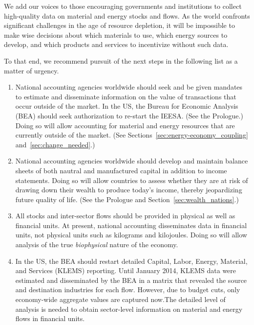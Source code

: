 We add our voices to those encouraging governments and 
institutions to collect high-quality data on material 
and energy stocks and flows.
As the world confronts significant challenges
in the age of resource depletion,
it will be impossible to make wise decisions about
which materials to use,
which energy sources to develop, and 
which products and services to incentivize
without such data.

To that end, we recommend pursuit of the next steps in the following list
as a matter of urgency.


\begin{enumerate}
	
	\item{National accounting agencies worldwide should seek and be given
			mandates to estimate and disseminate information on 
			the value of transactions that occur outside of the market.
			In the US, the Bureau for Economic Analysis (BEA) should seek authorization 
			to re-start the IEESA. 
			(See the Prologue.)
			Doing so will allow accounting for material and energy resources
			that are currently outside of the market.
			(See Sections~\ref{sec:energy-economy_coupling}
			and~\ref{sec:change_needed}.)}

	\item{National accounting agencies worldwide should develop and maintain 
			balance sheets of both nautral and manufactured capital 
			in addition to income statements.
			Doing so will allow countries to assess whether they are at risk of drawing down
			their wealth to produce today's income, 
			thereby jeopardizing future quality of life.
			(See the Prologue and Section~\ref{sec:wealth_nations}.)}

	\item{All stocks and inter-sector flows should be provided 
			in physical as well as financial units.
			At present, national accounting disseminates data in financial units,
			not physical units such as kilograms and kilojoules.
			Doing so will allow analysis of the true 
			\emph{biophysical} nature of the economy.}

	\item{In the US, the BEA should restart detailed 
			Capital, Labor, Energy, Material, and Services (KLEMS)
			reporting.
			Until January 2014, KLEMS data were estimated and disseminated by the BEA
			in a matrix that revealed the source and destination industries
			for each flow. 
			However, due to budget cuts, only economy-wide aggregate values are 
			captured now.The detailed level of analysis is needed to
			obtain sector-level information 
			on material and energy flows
			in financial units.}


\end{enumerate}
